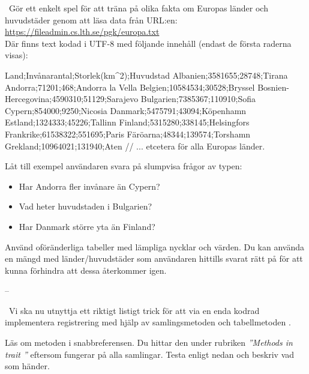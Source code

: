 \ExtraTasks %


\QUESTBEGIN

\Task \what~Gör ett enkelt spel för att träna på olika fakta om Europas länder och huvudstäder genom att läsa data från URL:en:\\ \url{https://fileadmin.cs.lth.se/pgk/europa.txt}
\\Där finns text kodad i UTF-8 med följande innehåll (endast de första raderna visas):
\begin{Code}
Land;Invånarantal;Storlek(km^2);Huvudstad
Albanien;3581655;28748;Tirana
Andorra;71201;468;Andorra la Vella
Belgien;10584534;30528;Bryssel
Bosnien-Hercegovina;4590310;51129;Sarajevo
Bulgarien;7385367;110910;Sofia
Cypern;854000;9250;Nicosia
Danmark;5475791;43094;Köpenhamn
Estland;1324333;45226;Tallinn
Finland;5315280;338145;Helsingfors
Frankrike;61538322;551695;Paris
Färöarna;48344;139574;Torshamn
Grekland;10964021;131940;Aten
// ... etcetera för alla Europas länder.
\end{Code}
Låt till exempel användaren svara på slumpvisa frågor av typen:
\begin{itemize}[noitemsep]
  \item Har Andorra fler invånare än Cypern?
  \item Vad heter huvudstaden i Bulgarien?
  \item Har Danmark större yta än Finland?
\end{itemize}
Använd oföränderliga tabeller med lämpliga nycklar och värden. Du kan använda en mängd med länder/huvudstäder som användaren hittills svarat rätt på för att kunna förhindra att dessa återkommer igen.
\SOLUTION

\TaskSolved --

\QUESTEND



\AdvancedTasks %



\QUESTBEGIN

\Task \what~Vi ska nu utnyttja ett riktigt listigt trick för att via en enda kodrad implementera registrering med hjälp av samlingsmetoden  och tabellmetoden .

\Subtask Läs om metoden  i snabbreferensen. Du hittar den under rubriken \emph{''Methods in trait ''} eftersom  fungerar på alla samlingar. Testa  enligt nedan och beskriv vad som händer.

